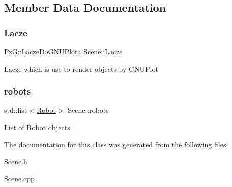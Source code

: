 \subsection{Member Data Documentation}
\mbox{\label{classScene_a294342f6e251f72e3c41dc6cb95b1df6}} 
\subsubsection{\texorpdfstring{Lacze}{Lacze}}
{\footnotesize\ttfamily \hyperlink{classPzG_1_1LaczeDoGNUPlota}{Pz\+G\+::\+Lacze\+Do\+G\+N\+U\+Plota} Scene\+::\+Lacze\hspace{0.3cm}{\ttfamily [private]}}

Lacze which is use to render objects by G\+N\+U\+Plot \mbox{\label{classScene_a914e69601e8711bb5b9a06c243854f88}} 
\subsubsection{\texorpdfstring{robots}{robots}}
{\footnotesize\ttfamily std\+::list$<$\hyperlink{classRobot}{Robot}$>$ Scene\+::robots\hspace{0.3cm}{\ttfamily [private]}}

List of \hyperlink{classRobot}{Robot} objects 

The documentation for this class was generated from the following files\+:\begin{DoxyCompactItemize}
\item 
\hyperlink{Scene_8h}{Scene.\+h}\item 
\hyperlink{Scene_8cpp}{Scene.\+cpp}\end{DoxyCompactItemize}
